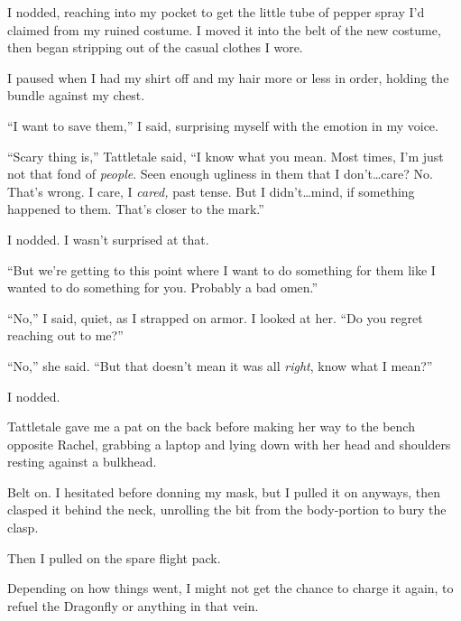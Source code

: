 I nodded, reaching into my pocket to get the little tube of pepper spray I'd claimed from my ruined costume.  I moved it into the belt of the new costume, then began stripping out of the casual clothes I wore.



I paused when I had my shirt off and my hair more or less in order, holding the bundle against my chest.



``I want to save them,'' I said, surprising myself with the emotion in my voice.



``Scary thing is,'' Tattletale said, ``I know what you mean.  Most times, I'm just not that fond of \emph{people}.  Seen enough ugliness in them that I don't\ldots care?  No.  That's wrong.  I care, I \emph{cared, }past tense.  But I didn't\ldots mind, if something happened to them.  That's closer to the mark.''



I nodded.  I wasn't surprised at that.



``But we're getting to this point where I want to do something for them like I wanted to do something for you.  Probably a bad omen.''



``No,'' I said, quiet, as I strapped on armor.  I looked at her.  ``Do you regret reaching out to me?''



``No,'' she said.  ``But that doesn't mean it was all \emph{right}, know what I mean?''



I nodded.



Tattletale gave me a pat on the back before making her way to the bench opposite Rachel, grabbing a laptop and lying down with her head and shoulders resting against a bulkhead.



Belt on.  I hesitated before donning my mask, but I pulled it on anyways, then clasped it behind the neck, unrolling the bit from the body-portion to bury the clasp.



Then I pulled on the spare flight pack.



Depending on how things went, I might not get the chance to charge it again, to refuel the Dragonfly or anything in that vein.



